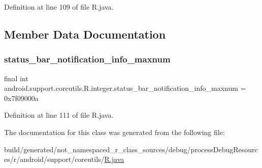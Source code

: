 Definition at line 109 of file R.\+java.


\begin{DoxyCode}{0}

\end{DoxyCode}


\subsection{Member Data Documentation}
\mbox{\label{classandroid_1_1support_1_1coreutils_1_1_r_1_1integer_a606a74180704d03d0e19248a38ad09dd}} 
\subsubsection{\texorpdfstring{status\_bar\_notification\_info\_maxnum}{status\_bar\_notification\_info\_maxnum}}
{\footnotesize\ttfamily final int android.\+support.\+coreutils.\+R.\+integer.\+status\+\_\+bar\+\_\+notification\+\_\+info\+\_\+maxnum = 0x7f09000a\hspace{0.3cm}{\ttfamily [static]}}



Definition at line 111 of file R.\+java.



The documentation for this class was generated from the following file\+:\begin{DoxyCompactItemize}
\item 
build/generated/not\+\_\+namespaced\+\_\+r\+\_\+class\+\_\+sources/debug/process\+Debug\+Resources/r/android/support/coreutils/\mbox{\hyperlink{android_2support_2coreutils_2_r_8java}{R.\+java}}\end{DoxyCompactItemize}
